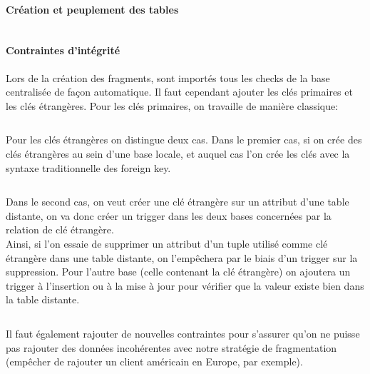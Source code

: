 \documentclass[10pt,a4paper]{article}
\theoremstyle{plain}
\begin{document}
\inputminted{sql}{INSA-DB12-EuropeNord-creation-liens-db.sql}
\newpage 

\paragraph{Création et peuplement des tables}

\inputminted{sql}{INSA-DB12-EuropeNord-fragmentation.sql}
\newpage 

\paragraph{Contraintes d'intégrité}

Lors de la création des fragments, sont importés tous les checks de la base centralisée de façon automatique. Il faut cependant ajouter les clés primaires et les clés étrangères. Pour les clés primaires, on travaille de manière classique:\\
\inputminted{sql}{INSA-DB12-EuropeNord-contraintes-pk.sql}

\newpage

Pour les clés étrangères on distingue deux cas. Dans le premier cas, si on crée des clés étrangères au sein d'une base locale, et auquel cas l'on crée les clés avec la syntaxe traditionnelle des foreign key.

\inputminted{sql}{INSA-DB12-EuropeNord-contraintes-fk.sql}

Dans le second cas, on veut créer une clé étrangère sur un attribut d'une table distante, on va donc créer un trigger dans les deux bases concernées par la relation de clé étrangère.\\
Ainsi, si l'on essaie de supprimer un attribut d'un tuple utilisé comme clé étrangère dans une table distante, on l'empêchera par le biais d'un trigger sur la suppression. Pour l'autre base (celle contenant la clé étrangère) on ajoutera un trigger à l'insertion ou à la mise à jour pour vérifier que la valeur existe bien dans la table distante. \\

\inputminted{sql}{INSA-DB12-EuropeNord-trigger.sql}

Il faut également rajouter de nouvelles contraintes pour s'assurer qu'on ne puisse pas rajouter des données incohérentes avec notre stratégie de fragmentation (empêcher de rajouter un client américain en Europe, par exemple).

\inputminted{sql}{INSA-DB12-EuropeNord-contraintes.sql}

\newpage
\end{document}

